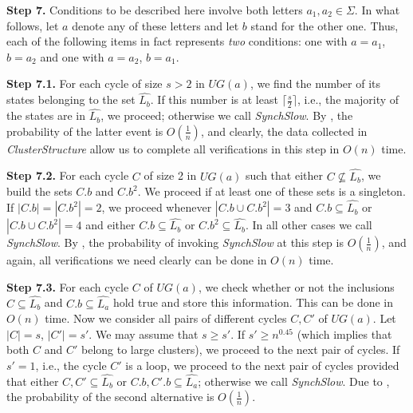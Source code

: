 \documentclass{llncs}
\begin{document}
\textbf{Step 7.} Conditions to be described here involve both letters $a_1,a_2\in\Sigma$. In what follows, let $a$ denote any of these letters and let $b$ stand for the other one. Thus, each of the following items in fact represents \emph{two} conditions: one with $a=a_1$, $b=a_2$ and one with $a=a_2$, $b=a_1$.

\smallskip

\textbf{Step 7.1.} For each cycle of size $s>2$ in $U\!G(a)$, we find the number of its states belonging to the set $\widehat{L_b}$. If this number is at least $\lceil\frac{s}2\rceil$, i.e., the majority of the states are in $\widehat{L_b}$, we proceed; otherwise we call \emph{SynchSlow}. By \cite[Theorem~2, Case~1]{Berlinkov:preprint}, the probability of the latter event is $O(\frac1n)$, and clearly, the data collected in \emph{ClusterStructure} allow us to complete all verifications in this step in $O(n)$ time.

\smallskip

\textbf{Step 7.2.} For each cycle $C$ of size 2 in $U\!G(a)$ such that either $C\nsubseteq\widehat{L_b}$, we build the sets $C.b$ and $C.b^2$. We proceed if at least one of these sets is a singleton. If $|C.b|=|C.b^2|=2$, we proceed whenever $|C.b\cup C.b^2|=3$ and $C.b\subseteq\widehat{L_b}$ or $|C.b\cup C.b^2|=4$ and either $C.b\subseteq\widehat{L_b}$ or $C.b^2\subseteq\widehat{L_b}$. In all other cases we call \emph{SynchSlow}. By \cite[Remark~1]{Berlinkov:preprint}, the probability of invoking \emph{SynchSlow} at this step is $O(\frac1n)$, and again, all verifications we need clearly can be done in $O(n)$ time.

\smallskip

\textbf{Step 7.3.} For each cycle $C$ of $U\!G(a)$, we check whether or not the inclusions $C\subseteq\widehat{L_b}$ and $C.b\subseteq\widehat{L_a}$ hold true and store this information. This can be done in $O(n)$ time. Now we consider all pairs of different cycles $C,C'$ of $U\!G(a)$. Let $|C|=s$, $|C'|=s'$. We may assume that $s\ge s'$. If $s'\ge n^{0.45}$ (which implies that both $C$ and $C'$ belong to large clusters), we proceed to the next pair of cycles. If $s'=1$, i.e., the cycle $C'$ is a loop, we proceed to the next pair of cycles provided that either $C,C'\subseteq\widehat{L_b}$ or $C.b,C'.b\subseteq\widehat{L_a}$; otherwise we call \emph{SynchSlow}. Due to \cite[Theorem~2, Case~2]{Berlinkov:preprint}, the probability of the second alternative is $O(\frac1n)$.
\end{document}
